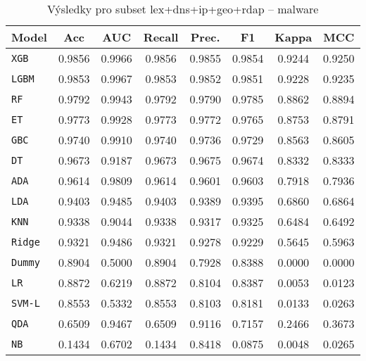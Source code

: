 \begin{table}[H]
  \centering
  \small
  \caption{Výsledky pro subset lex+dns+ip+geo+rdap – malware}
  \begin{tabular}{|l|c|c|c|c|c|c|c|}
    \hline
    \textbf{Model} & \textbf{Acc} & \textbf{AUC} & \textbf{Recall} & \textbf{Prec.} & \textbf{F1} & \textbf{Kappa} & \textbf{MCC} \\
    \hline
    \texttt{XGB} & 0.9856 & 0.9966 & 0.9856 & 0.9855 & 0.9854 & 0.9244 & 0.9250 \\
    \texttt{LGBM} & 0.9853 & 0.9967 & 0.9853 & 0.9852 & 0.9851 & 0.9228 & 0.9235 \\
    \texttt{RF} & 0.9792 & 0.9943 & 0.9792 & 0.9790 & 0.9785 & 0.8862 & 0.8894 \\
    \texttt{ET} & 0.9773 & 0.9928 & 0.9773 & 0.9772 & 0.9765 & 0.8753 & 0.8791 \\
    \texttt{GBC} & 0.9740 & 0.9910 & 0.9740 & 0.9736 & 0.9729 & 0.8563 & 0.8605 \\
    \texttt{DT} & 0.9673 & 0.9187 & 0.9673 & 0.9675 & 0.9674 & 0.8332 & 0.8333 \\
    \texttt{ADA} & 0.9614 & 0.9809 & 0.9614 & 0.9601 & 0.9603 & 0.7918 & 0.7936 \\
    \texttt{LDA} & 0.9403 & 0.9485 & 0.9403 & 0.9389 & 0.9395 & 0.6860 & 0.6864 \\
    \texttt{KNN} & 0.9338 & 0.9044 & 0.9338 & 0.9317 & 0.9325 & 0.6484 & 0.6492 \\
    \texttt{Ridge} & 0.9321 & 0.9486 & 0.9321 & 0.9278 & 0.9229 & 0.5645 & 0.5963 \\
    \texttt{Dummy} & 0.8904 & 0.5000 & 0.8904 & 0.7928 & 0.8388 & 0.0000 & 0.0000 \\
    \texttt{LR} & 0.8872 & 0.6219 & 0.8872 & 0.8104 & 0.8387 & 0.0053 & 0.0123 \\
    \texttt{SVM-L} & 0.8553 & 0.5332 & 0.8553 & 0.8103 & 0.8181 & 0.0133 & 0.0263 \\
    \texttt{QDA} & 0.6509 & 0.9467 & 0.6509 & 0.9116 & 0.7157 & 0.2466 & 0.3673 \\
    \texttt{NB} & 0.1434 & 0.6702 & 0.1434 & 0.8418 & 0.0875 & 0.0048 & 0.0265 \\
    \hline
  \end{tabular}
\end{table}
\vspace{0.5cm}

